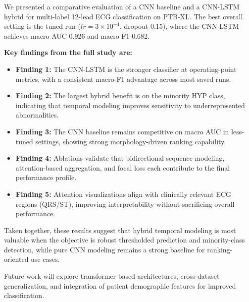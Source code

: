 \documentclass[conference]{IEEEtran}
\begin{document}
We presented a comparative evaluation of a CNN baseline and a CNN-LSTM hybrid for multi-label 12-lead ECG classification on PTB-XL. The best overall setting is the tuned run ($lr = 3\times10^{-4}$, dropout 0.15), where the CNN-LSTM achieves macro AUC 0.926 and macro F1 0.682.

\textbf{Key findings from the full study are:}
\begin{itemize}
    \item \textbf{Finding 1:} The CNN-LSTM is the stronger classifier at operating-point metrics, with a consistent macro-F1 advantage across most saved runs.
    \item \textbf{Finding 2:} The largest hybrid benefit is on the minority HYP class, indicating that temporal modeling improves sensitivity to underrepresented abnormalities.
    \item \textbf{Finding 3:} The CNN baseline remains competitive on macro AUC in less-tuned settings, showing strong morphology-driven ranking capability.
    \item \textbf{Finding 4:} Ablations validate that bidirectional sequence modeling, attention-based aggregation, and focal loss each contribute to the final performance profile.
    \item \textbf{Finding 5:} Attention visualizations align with clinically relevant ECG regions (QRS/ST), improving interpretability without sacrificing overall performance.
\end{itemize}

Taken together, these results suggest that hybrid temporal modeling is most valuable when the objective is robust thresholded prediction and minority-class detection, while pure CNN modeling remains a strong baseline for ranking-oriented use cases.

Future work will explore transformer-based architectures, cross-dataset generalization, and integration of patient demographic features for improved classification.
\end{document}
